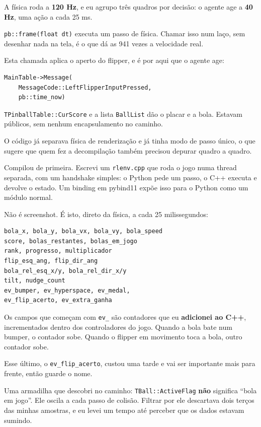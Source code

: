 \documentclass[10pt,a4paper,twoside,twocolumn]{scrartcl}
\let\oldtexttt\texttt
\renewcommand{\texttt}[1]{{\small\oldtexttt{#1}}}
\begin{document}
A física roda a \textbf{120 Hz}, e eu agrupo três quadros por decisão: o
agente age a \textbf{40 Hz}, uma ação a cada 25 ms.

\texttt{pb::frame(float\ dt)} executa um passo de física. Chamar isso
num laço, sem desenhar nada na tela, é o que dá as 941 vezes a
velocidade real.

Esta chamada aplica o aperto do flipper, e é por aqui que o agente age:

\begin{verbatim}
MainTable->Message(
    MessageCode::LeftFlipperInputPressed,
    pb::time_now)
\end{verbatim}

\texttt{TPinballTable::CurScore} e a lista \texttt{BallList} dão o
placar e a bola. Estavam públicos, sem nenhum encapsulamento no caminho.

O código já separava física de renderização e já tinha modo de passo
único, o que sugere que quem fez a decompilação também precisou depurar
quadro a quadro.

Compilou de primeira. Escrevi um \texttt{rlenv.cpp} que roda o jogo numa
thread separada, com um handshake simples: o Python pede um passo, o C++
executa e devolve o estado. Um binding em pybind11 expõe isso para o
Python como um módulo normal.

Não é screenshot. É isto, direto da física, a cada 25 milissegundos:

\begin{verbatim}
bola_x, bola_y, bola_vx, bola_vy, bola_speed
score, bolas_restantes, bolas_em_jogo
rank, progresso, multiplicador
flip_esq_ang, flip_dir_ang
bola_rel_esq_x/y, bola_rel_dir_x/y
tilt, nudge_count
ev_bumper, ev_hyperspace, ev_medal,
ev_flip_acerto, ev_extra_ganha
\end{verbatim}

Os campos que começam com \texttt{ev\_} são contadores que eu
\textbf{adicionei ao C++}, incrementados dentro dos controladores do
jogo. Quando a bola bate num bumper, o contador sobe. Quando o flipper
em movimento toca a bola, outro contador sobe.

Esse último, o \texttt{ev\_flip\_acerto}, custou uma tarde e vai ser
importante mais para frente, então guarde o nome.

Uma armadilha que descobri no caminho: \texttt{TBall::ActiveFlag}
\textbf{não} significa ``bola em jogo''. Ele oscila a cada passo de
colisão. Filtrar por ele descartava dois terços das minhas amostras, e
eu levei um tempo até perceber que os dados estavam sumindo.
\end{document}
